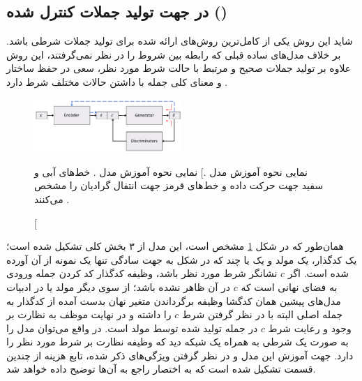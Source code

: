 \subsection{
    در جهت تولید جملات کنترل شده
(\lr{\towardctg{}})\protect{}}
شاید این روش یکی از کامل‌ترین روش‌های ارائه شده برای تولید جملات شرطی باشد. بر خلاف مدل‌های ساده قبلی که رابطه بین شروط را در نظر نمی‌گرفتند، این روش علاوه بر تولید جملات صحیح و مرتبط با حالت شرط مورد نظر، سعی در حفظ ساختار و معنای کلی جمله با داشتن حالات مختلف شرط دارد \cite{toward}.
\begin{figure}[h]
	\centering
	\includegraphics[width=0.5\textwidth]{images/toward1.png}
	\caption
    [نمایی نحوه آموزش مدل \towardctg.]
    {
		نمایی نحوه آموزش مدل \towardctg. خط‌های آبی و سفید جهت حرکت داده و خط‌های قرمز جهت انتفال گرادیان را مشخص می‌کنند \cite{toward}.}
	\label{fig:toward}
\end{figure}
همان‌طور که در شکل \ref{fig:toward} مشخص است، این مدل از ۳ بخش کلی تشکیل شده است؛ یک کدگذار، یک مولد و یک یا چند \discriminator{} که در شکل به جهت سادگی تنها یک نمونه از آن آورده شده است. اگر $c$ نشانگر شرط مورد نظر باشد، وظیفه کدگذار کد کردن جمله ورودی به فضای نهانی است که $c$ در آن ظاهر نشده باشد؛ از سوی دیگر مولد یا در ادبیات مدل‌های پیشین همان کدگشا وظیفه برگرداندن متغیر نهان بدست آمده از کدگذار به جمله اصلی البته با در نظر گرفتن شرط $c$ را داشته و در نهایت \discriminator{} موظف به نظارت بر وجود و رعایت شرط $c$ در جمله تولید شده توسط مولد است. در واقع می‌توان مدل را به صورت یک \vae{} شرطی به همراه یک شبکه \discriminator{} دید که وظیفه نظارت بر شرط مورد نظر را دارد. جهت آموزش این مدل و در نظر گرفتن ویژگی‌های ذکر شده، تابع هزینه از چندین قسمت تشکیل شده است که به اختصار راجع به آن‌ها توضیح داده خواهد شد.\\

